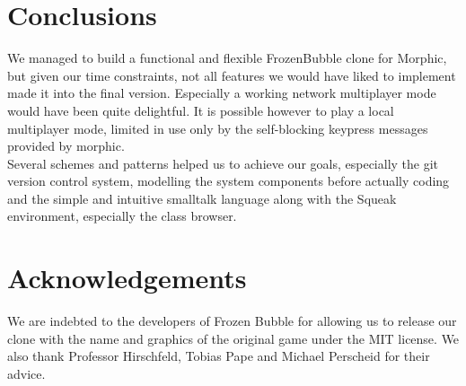 \section{Conclusions}
We managed to build a functional and flexible FrozenBubble clone for Morphic,
but given our time constraints, not all features we would have liked to implement
made it into the final version. Especially a working network multiplayer mode would
have been quite delightful. It is possible however to play a local multiplayer mode,
limited in use only by the self-blocking keypress messages provided by morphic.\\
Several schemes and patterns helped us to achieve our goals, especially the git version
control system, modelling the system components before actually coding and the simple 
and intuitive smalltalk language along with the Squeak environment, especially the class
browser.

\section*{Acknowledgements}
We are indebted to the developers of Frozen Bubble for allowing us to release 
our clone with the name and graphics of the original game under the MIT 
license. We also thank Professor Hirschfeld, Tobias Pape and Michael Perscheid for 
their advice.
